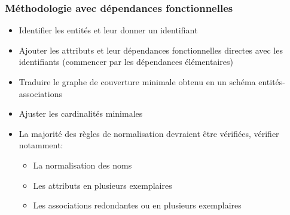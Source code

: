 \begin{frame}
  \frametitle{Méthodologie avec dépendances fonctionnelles}
  \begin{itemize}
    \item Identifier les entités et leur donner un identifiant
    \item Ajouter les attributs et leur dépendances fonctionnelles directes avec les identifiants
      (commencer par les dépendances élémentaires)
    \item Traduire le graphe de couverture minimale obtenu en un schéma entités-associations
    \item Ajuster les cardinalités minimales
    \item La majorité des règles de normalisation devraient être vérifiées, vérifier notamment:
      \begin{itemize}
        \item La normalisation des noms
        \item Les attributs en plusieurs exemplaires
        \item Les associations redondantes ou en plusieurs exemplaires
      \end{itemize}
  \end{itemize}
\end{frame}


